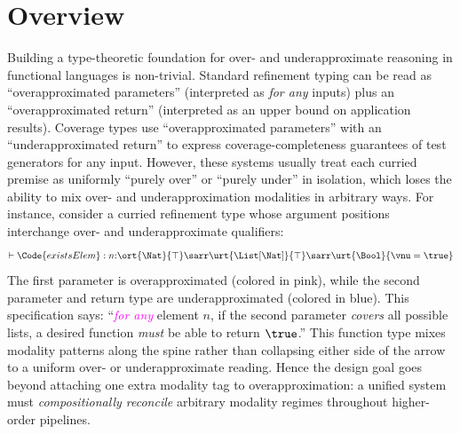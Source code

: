 \section{Overview}\label{sec:overview}

Building a type-theoretic foundation for over- and underapproximate reasoning in functional languages is non-trivial.
Standard refinement typing can be read as ``overapproximated parameters'' (interpreted as \emph{for any} inputs) plus an ``overapproximated return'' (interpreted as an upper bound on application results).
Coverage types use ``overapproximated parameters'' with an ``underapproximated return'' to express coverage-completeness guarantees of test generators for any input.
However, these systems usually treat each curried premise as uniformly ``purely over'' or ``purely under'' in isolation, which loses the ability to mix over- and underapproximation modalities in arbitrary ways.
For instance, consider a curried refinement type whose argument positions interchange over- and underapproximate qualifiers:
\begin{align*}
    \vdash \Code{existsElem} : n{:}\ort{\Nat}{\top} \sarr \urt{\List[\Nat]}{\top} \sarr \urt{\Bool}{\vnu = \true} 
\end{align*}\noindent
The first parameter is overapproximated (colored in pink), while the second parameter and return type are underapproximated (colored in blue).
This specification says: ``\textcolor{magenta}{\emph{for any}} element $n$, if the second parameter \textcolor{CobaltBlue}{\emph{covers}} all possible lists, a desired  function \textcolor{CobaltBlue}{\emph{must}} be able to return $\true$.'' 
This function type mixes modality patterns along the spine rather than collapsing either side of the arrow to a uniform over- or underapproximate reading.
Hence the design goal goes beyond attaching one extra modality tag to overapproximation: a unified system must
\emph{compositionally reconcile} arbitrary modality regimes throughout higher-order pipelines.


